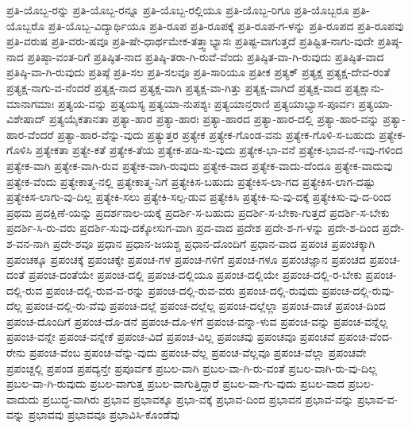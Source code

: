 {ಪ್ರತಿ-ಯೊಬ್ಬ-ರನ್ನು
ಪ್ರತಿ-ಯೊಬ್ಬ-ರನ್ನೂ
ಪ್ರತಿ-ಯೊಬ್ಬ-ರಲ್ಲಿಯೂ
ಪ್ರತಿ-ಯೊಬ್ಬ-ರಿಗೂ
ಪ್ರತಿ-ಯೊಬ್ಬರೂ
ಪ್ರತಿ-ಯೊಬ್ಬರೊ
ಪ್ರತಿ-ಯೊಬ್ಬ-ವಿದ್ಯಾರ್ಥಿಯೂ
ಪ್ರತಿ-ರೂಪ
ಪ್ರತಿ-ರೂಪಕ್ಕೆ
ಪ್ರತಿ-ರೂಪ-ಗ-ಳನ್ನು
ಪ್ರತಿ-ರೂಪದ
ಪ್ರತಿ-ರೂಪವು
ಪ್ರತಿ-ವರುಷ
ಪ್ರತಿ-ವರು-ಷವೂ
ಪ್ರತಿ-ಷೇ-ಧಾರ್ಥಮೇಕ-ತತ್ತ್ವಾಭ್ಯಾಸಃ
ಪ್ರತಿಷ್ಟ-ವಾಗುತ್ತದೆ
ಪ್ರತಿಷ್ಟಿತ-ನಾಗು-ವುದೇ
ಪ್ರತಿಷ್ಠ-ನಾದ
ಪ್ರತಿಷ್ಠಾ-ವಂತ-ರಿಗೆ
ಪ್ರತಿಷ್ಠಿತ-ನಾದ
ಪ್ರತಿಷ್ಠಿ-ತರಾ-ಗಿ-ರುವೆ-ವೆಂದು
ಪ್ರತಿಷ್ಠಿತ-ವಾ-ಗಿ-ರುವುದು
ಪ್ರತಿಷ್ಠಿತ-ವಾದ
ಪ್ರತಿಷ್ಠಿ-ವಾ-ಗಿ-ರುವುದು
ಪ್ರತಿಷ್ಠೆ
ಪ್ರತಿ-ಸಲ
ಪ್ರತಿ-ಸಲವೂ
ಪ್ರತಿ-ಸಾರಿಯೂ
ಪ್ರತೀಕ
ಪ್ರತ್ಯಕ್
ಪ್ರತ್ಯಕ್ಷ
ಪ್ರತ್ಯಕ್ಷ-ದೇವ-ರಂತೆ
ಪ್ರತ್ಯಕ್ಷ-ನಾಗು-ವ-ನೆಂದರೆ
ಪ್ರತ್ಯಕ್ಷ-ನಾದ
ಪ್ರತ್ಯಕ್ಷ-ವಾಗಿ
ಪ್ರತ್ಯಕ್ಷ-ವಾ-ಗಿತ್ತು
ಪ್ರತ್ಯಕ್ಷ-ವಾಗಿದೆ
ಪ್ರತ್ಯಕ್ಷ-ವಾದ
ಪ್ರತ್ಯಕ್ಷಾನು-ಮಾನಾಗಮಾಃ
ಪ್ರತ್ಯಯ-ವನ್ನು
ಪ್ರತ್ಯಯಸ್ಯ
ಪ್ರತ್ಯಯಾ-ನುಪಶ್ಯಃ
ಪ್ರತ್ಯಯಾನ್ತರಾಣಿ
ಪ್ರತ್ಯಯಾಭ್ಯಾಸ-ಪೂರ್ವಃ
ಪ್ರತ್ಯಯಾ-ವಿಶೇಷಾದ್
ಪ್ರತ್ಯಯೈಕತಾನತಾ
ಪ್ರತ್ಯಾ-ಹಾರ
ಪ್ರತ್ಯಾ-ಹಾರಃ
ಪ್ರತ್ಯಾ-ಹಾರದ
ಪ್ರತ್ಯಾ-ಹಾರ-ದಲ್ಲಿ
ಪ್ರತ್ಯಾ-ಹಾರ-ವನ್ನು
ಪ್ರತ್ಯಾ-ಹಾರ-ವೆಂದರೆ
ಪ್ರತ್ಯಾ-ಹಾರ-ವೆನ್ನು-ವುದು
ಪ್ರತ್ಯುತ್ತರ
ಪ್ರತ್ಯೇಕ
ಪ್ರತ್ಯೇಕ-ಗೊಂಡ-ವನು
ಪ್ರತ್ಯೇಕ-ಗೊಳಿ-ಸ-ಬಹುದು
ಪ್ರತ್ಯೇಕ-ಗೊಳಿಸಿ
ಪ್ರತ್ಯೇಕತಾ
ಪ್ರತ್ಯೇ-ಕತೆ
ಪ್ರತ್ಯೇಕ-ತೆಯ
ಪ್ರತ್ಯೇಕ-ಪಡಿ-ಸು-ವುದು
ಪ್ರತ್ಯೇಕ-ಭಾ-ವನೆ
ಪ್ರತ್ಯೇಕ-ಭಾವ-ನೆ-ಇವು-ಗಳಿಂದ
ಪ್ರತ್ಯೇಕ-ವಾಗಿ
ಪ್ರತ್ಯೇಕ-ವಾಗಿ-ರುವ
ಪ್ರತ್ಯೇಕ-ವಾಗಿ-ರುವುದು
ಪ್ರತ್ಯೇಕ-ವಾದ
ಪ್ರತ್ಯೇಕ-ವಾದು-ದೆಂದೂ
ಪ್ರತ್ಯೇಕ-ವಾದುವು
ಪ್ರತ್ಯೇಕ-ವೆಂದು
ಪ್ರತ್ಯೇಕಾತ್ಮ-ನಲ್ಲಿ
ಪ್ರತ್ಯೇಕಾತ್ಮ-ನಿಗೆ
ಪ್ರತ್ಯೇಕಿಸ-ಬಹುದು
ಪ್ರತ್ಯೇಕಿಸ-ಲಾ-ಗದ
ಪ್ರತ್ಯೇಕಿಸ-ಲಾಗ-ದಷ್ಟು
ಪ್ರತ್ಯೇಕಿಸ-ಲಾಗು-ವು-ದಿಲ್ಲ
ಪ್ರತ್ಯೇಕಿ-ಸಲು
ಪ್ರತ್ಯೇಕಿ-ಸಲ್ಪ-ಡುವ
ಪ್ರತ್ಯೇಕಿಸಿ
ಪ್ರತ್ಯೇಕಿ-ಸು-ವು-ದಕ್ಕೆ
ಪ್ರತ್ಯೇಕಿಸು-ವು-ದ-ರಿಂದ
ಪ್ರಥಮ
ಪ್ರದಕ್ಷಿಣೆ-ಯನ್ನು
ಪ್ರದರ್ಶನಾಲ-ಯಕ್ಕೆ
ಪ್ರದರ್ಶಿ-ಸ-ಬಹುದು
ಪ್ರದರ್ಶಿ-ಸ-ಬೇಕಾ-ಗುತ್ತದೆ
ಪ್ರದರ್ಶಿ-ಸ-ಬೇಕು
ಪ್ರದರ್ಶಿ-ಸಿ-ರು-ವರು
ಪ್ರದರ್ಶಿ-ಸುವು-ದಕ್ಕೋಸುಗ-ವಾಗಿ
ಪ್ರದ-ವಾದ
ಪ್ರದೇಶ
ಪ್ರದೇ-ಶ-ಗ-ಳನ್ನು
ಪ್ರದೇ-ಶ-ದಿಂದ
ಪ್ರದೇ-ಶ-ವನ-ನಾಗಿ
ಪ್ರದೇ-ಶವೂ
ಪ್ರಧಾನ
ಪ್ರಧಾನ-ಜಯಶ್ಚ
ಪ್ರಧಾನ-ದೊಂದಿಗೆ
ಪ್ರಧಾನ-ವಾದ
ಪ್ರಪಂಚ
ಪ್ರಪಂಚಕ್ಕಾಗಿ
ಪ್ರಪಂಚಕ್ಕೂ
ಪ್ರಪಂಚಕ್ಕೆ
ಪ್ರಪಂಚಕ್ಕೇ
ಪ್ರಪಂಚ-ಗಳ
ಪ್ರಪಂಚ-ಗಳಿಗೆ
ಪ್ರಪಂಚ-ಗಳೂ
ಪ್ರಪಂಚಜ್ಞಾನ
ಪ್ರಪಂಚದ
ಪ್ರಪಂಚ-ದಂತೆ
ಪ್ರಪಂಚ-ದಂತೆಯೇ
ಪ್ರಪಂಚ-ದಲ್ಲಿ
ಪ್ರಪಂಚ-ದಲ್ಲಿಯೂ
ಪ್ರಪಂಚ-ದಲ್ಲಿಯೇ
ಪ್ರಪಂಚ-ದಲ್ಲಿ-ರ-ಬೇಕು
ಪ್ರಪಂಚ-ದಲ್ಲಿ-ರುವ
ಪ್ರಪಂಚ-ದಲ್ಲಿ-ರುವ-ವ-ರನ್ನು
ಪ್ರಪಂಚ-ದಲ್ಲಿ-ರುವ-ವರು
ಪ್ರಪಂಚ-ದಲ್ಲಿ-ರುವುದು
ಪ್ರಪಂಚ-ದಲ್ಲಿ-ರುವು-ದೆಲ್ಲ
ಪ್ರಪಂಚ-ದಲ್ಲಿ-ರು-ವೆವು
ಪ್ರಪಂಚ-ದಲ್ಲೆ
ಪ್ರಪಂಚ-ದಲ್ಲೆಲ್ಲ
ಪ್ರಪಂಚ-ದಲ್ಲೆಲ್ಲಾ
ಪ್ರಪಂಚ-ದಾಚೆ
ಪ್ರಪಂಚ-ದಿಂದ
ಪ್ರಪಂಚ-ದೊಂದಿಗೆ
ಪ್ರಪಂಚ-ದೊ-ಡನೆ
ಪ್ರಪಂಚ-ದೊ-ಳಗೆ
ಪ್ರಪಂಚ-ವನ್ನಾ-ಳುವ
ಪ್ರಪಂಚ-ವನ್ನು
ಪ್ರಪಂಚ-ವನ್ನೆಲ್ಲ
ಪ್ರಪಂಚ-ವನ್ನೇ
ಪ್ರಪಂಚ-ವನ್ನೇಕೆ
ಪ್ರಪಂಚ-ವಿದೆ
ಪ್ರಪಂಚ-ವಿಲ್ಲ
ಪ್ರಪಂಚವು
ಪ್ರಪಂಚವೂ
ಪ್ರಪಂಚವೆ
ಪ್ರಪಂಚ-ವೆಂದ-ರೇನು
ಪ್ರಪಂಚ-ವೆಂಬ
ಪ್ರಪಂಚ-ವೆನ್ನು-ವುದು
ಪ್ರಪಂಚ-ವೆಲ್ಲ
ಪ್ರಪಂಚ-ವೆಲ್ಲವೂ
ಪ್ರಪಂಚ-ವೆಲ್ಲಾ
ಪ್ರಪಂಚವೇ
ಪ್ರಪಂಚ್ದಲ್ಲಿ
ಪ್ರಪಂಡ
ಪ್ರಪದ್ಯನ್ತೇ
ಪ್ರಪೂರ್ವಕ
ಪ್ರಬಲ-ವಾಗಿ
ಪ್ರಬಲ-ವಾ-ಗಿ-ರು-ವಂತೆ
ಪ್ರಬಲ-ವಾಗಿ-ರು-ವು-ದಿಲ್ಲ
ಪ್ರಬಲ-ವಾ-ಗಿ-ರುವುದು
ಪ್ರಬಲ-ವಾಗುತ್ತ
ಪ್ರಬಲ-ವಾಗುತ್ತಿದ್ದಾರೆ
ಪ್ರಬಲ-ವಾ-ಗು-ವುದು
ಪ್ರಬಲ-ವಾದ
ಪ್ರಬಲ-ವಾದುದು
ಪ್ರಬುದ್ಧ-ವಾಗಿರು
ಪ್ರಭಾವ
ಪ್ರಭಾವಕ್ಕೂ
ಪ್ರಭಾ-ವಕ್ಕೆ
ಪ್ರಭಾವ-ದಿಂದ
ಪ್ರಭಾವನ
ಪ್ರಭಾವ-ವನ್ನು
ಪ್ರಭಾವ-ವ-ವನ್ನು
ಪ್ರಭಾವವು
ಪ್ರಭಾವವೂ
ಪ್ರಭಾವಿಸಿ-ಕೊಂಡೆವು
}
